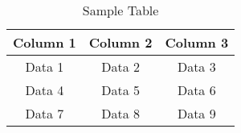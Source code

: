 
\begin{table}[h]
\centering
\begin{tabular}{|c|c|c|}
\hline
Column 1 & Column 2 & Column 3 \\ 
\hline
Data 1   & Data 2   & Data 3   \\ 
Data 4   & Data 5   & Data 6   \\
Data 7   & Data 8   & Data 9   \\
\hline
\end{tabular}
\caption{Sample Table}
\label{table:sample}
\end{table}
